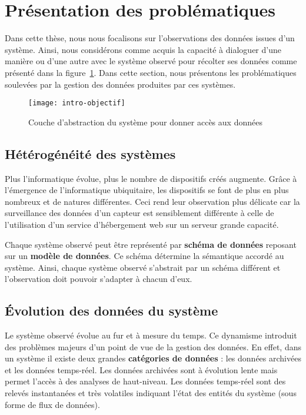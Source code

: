 \section{Présentation des problématiques}\label{sec:intro:problematique}
Dans cette thèse, nous nous focalisons sur l'observations des données issues d'un système. Ainsi, nous considérons comme acquis la capacité à dialoguer d'une manière ou d'une autre avec le système observé pour récolter ses données comme présenté dans la figure~\ref{fig:intro:objectif:abstraction}. Dans cette section, nous présentons les problématiques soulevées par la gestion des données produites par ces systèmes.

\begin{figure}[ht]
\centering
\texttt{[image: intro-objectif]}
\caption{Couche d'abstraction du système pour donner accès aux données}\label{fig:intro:objectif:abstraction}
\end{figure}

\subsection{Hétérogénéité des systèmes}
Plus l'informatique évolue, plus le nombre de dispositifs créés augmente. Grâce à l'émergence de l'informatique ubiquitaire, les dispositifs se font de plus en plus nombreux et de natures différentes. Ceci rend leur observation plus délicate car la surveillance des données d'un capteur est sensiblement différente à celle de l'utilisation d'un service d'hébergement web sur un serveur grande capacité.

Chaque système observé peut être représenté par \textbf{schéma de données} reposant sur un \textbf{modèle de données}. Ce schéma détermine la sémantique accordé au système. Ainsi, chaque système observé s'abstrait par un schéma différent et l'observation doit pouvoir s'adapter à chacun d'eux.

\subsection{Évolution des données du système}
Le système observé évolue au fur et à mesure du temps. Ce dynamisme introduit des problèmes majeurs d'un point de vue de la gestion des données. En effet, dans un système il existe deux grandes \textbf{catégories de données} : les données archivées et les données temps-réel. Les données archivées sont à évolution lente mais permet l'accès à des analyses de haut-niveau. Les données temps-réel sont des relevés instantanées et très volatiles indiquant l'état des entités du système (sous forme de flux de données).

